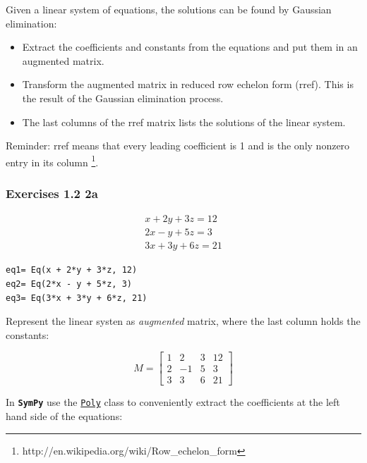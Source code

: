 \documentclass[a4paper]{article}
\newcommand{\sympy}{\textbf{\texttt{\textcolor{OliveGreen}{SymPy}} }}
\begin{document}
Given a linear system of equations, the solutions can be found by Gaussian
elimination:

\begin{itemize}
\item Extract the coefficients and constants from the equations and put them in
an augmented matrix.
\item Transform the augmented matrix in reduced row echelon form (rref). This is
the result of the Gaussian elimination process.
\item The last columns of the rref matrix lists the solutions of the linear system.
\end{itemize}

Reminder: rref means that every leading coefficient is 1 and is the only nonzero
entry in its column \footnote{http://en.wikipedia.org/wiki/Row\_echelon\_form}. 

\subsubsection{Exercises 1.2 2a}

\begin{equation}
\begin{matrix}x + 2 y + 3 z = 12\\2 x - y + 5 z = 3\\3 x + 3 y + 6 z = 21\end{matrix}
\end{equation}

\begin{verbatim}
eq1= Eq(x + 2*y + 3*z, 12)
eq2= Eq(2*x - y + 5*z, 3)
eq3= Eq(3*x + 3*y + 6*z, 21)
\end{verbatim}

Represent the linear systen as \textit{augmented} matrix, where the last column
holds the constants:

\begin{equation}
M= \left[\begin{matrix}1 & 2 & 3 & \textit{12}\\
                       2 & -1 & 5 & \textit{3}\\
                       3 & 3 & 6 & \textit{21}\end{matrix}\right]
\end{equation}

In \sympy use the \href{http://docs.sympy.org/latest/modules/polys/reference.html#sympy.polys.polytools.Poly}{\texttt{Poly}}
class to conveniently extract the coefficients at the left hand side of
the equations:
\end{document}
